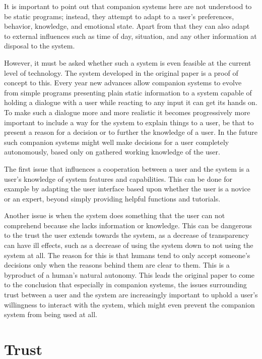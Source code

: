 \documentclass[a4paper]{article}
\begin{document}
It is important to point out that companion systems here are not understood to be static programs; instead, they attempt to adapt to a user's preferences, behavior, knowledge, and emotional state. Apart from that they can also adapt to external influences such as time of day, situation, and any other information at disposal to the system.

However, it must be asked whether such a system is even feasible at the current level of technology. The system developed in the original paper is a proof of concept to this. Every year new advances allow companion systems to evolve from simple programs presenting plain static information to a system capable of holding a dialogue with a user while reacting to any input it can get its hands on. To make such a dialogue more and more realistic it becomes progressively more important to include a way for the system to explain things to a user, be that to present a reason for a decision or to further the knowledge of a user. In the future such companion systems might well make decisions for a user completely autonomously, based only on gathered working knowledge of the user.

The first issue that influences a cooperation between a user and the system is a user's knowledge of system features and capabilities. This can be done for example by adapting the user interface based upon whether the user is a novice or an expert, beyond simply providing helpful functions and tutorials.

Another issue is when the system does something that the user can not comprehend because she lacks information or knowledge. This can be dangerous to the trust the user extends towards the system, as a decrease of transparency can have ill effects, such as a decrease of using the system down to not using the system at all. The reason for this is that humans tend to only accept someone's decisions only when the reasons behind them are clear to them. This is a byproduct of a human's natural autonomy. This leads the original paper to come to the conclusion that especially in companion systems, the issues surrounding trust between a user and the system are increasingly important to uphold a user's willingness to interact with the system, which might even prevent the companion system from being used at all.

\section{Trust}
\end{document}
